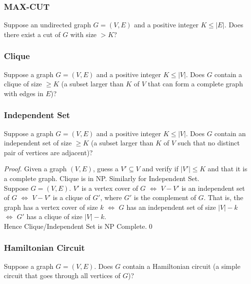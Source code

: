 \subsubsection{MAX-CUT} Suppose an undirected graph $G=\left( V,E \right) $ and a
positive integer $K\le \left| E \right| $. Does there exist a cut of $G$ with
size $>K$? 

\subsubsection{Clique} Suppose a graph $G=\left( V,E \right) $ and a positive
integer $K\le \left| V \right| $. Does $G$ contain a clique of size $\ge K$ (a
subset larger than $K$ of $V$ that can form a complete graph with edges in
$E$)?

\subsubsection{Independent Set} Suppose a graph $G=\left( V,E \right) $ and a
positive integer $K\le \left| V \right| $. Does $G$ contain an independent set
of size $\ge K$ (a subset larger than $K$ of $V$ such that no distinct pair of
vertices are adjacent)?\\

\begin{proof}
  Given a graph $\left( V,E \right) $, guess a $V'\subseteq V$ and verify if
  $\left| V' \right| \le K$ and that it is a complete graph. Clique is in NP.
  Similarly for Independent Set.\\

  Suppose $G=\left( V,E \right) $. $V'$ is a vertex cover of $G$ $\iff$ $V-V'$
  is an independent set of $G$ $\iff$ $V-V'$ is a clique of $G'$, where $G'$ is
  the complement of $G$. That is, the graph has a vertex cover of size $k$
  $\iff$ $G$ has an independent set of size $\left| V \right| -k$ $\iff$ $G'$
  has a clique of size $\left| V \right| -k$.\\

  Hence Clique/Independent Set is NP Complete.\qed
\end{proof}

\subsubsection{Hamiltonian Circuit} Suppose a graph $G=\left( V,E \right) $. Does
$G$ contain a Hamiltonian circuit (a simple circuit that goes through all
vertices of $G$)?

